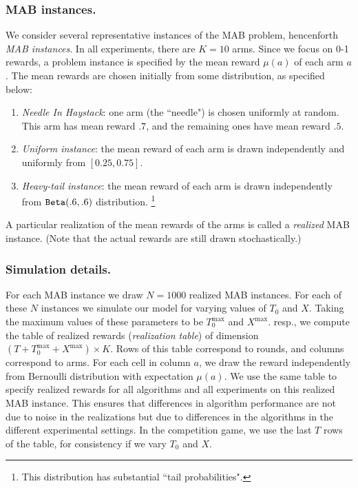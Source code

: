 \documentclass[../competing_bandits.tex]{subfiles}
\begin{document}

\subsubsection{MAB instances.} We consider several representative instances of the MAB problem, hencenforth \emph{MAB instances}. In all experiments, there are $K=10$ arms. Since we focus on 0-1 rewards, a problem instance is specified by the mean reward $\mu(a)$ of each arm $a$. The mean rewards are chosen initially from some distribution, as specified below:
\begin{enumerate}
\item \emph{Needle In Haystack}: one arm (the ``needle") is chosen uniformly at random. This arm has mean reward $.7$, and the remaining ones have mean reward $.5$.

\item \emph{Uniform instance}: the mean reward of each arm is drawn independently and uniformly from $[0.25, 0.75]$.
\item \emph{Heavy-tail instance}: the mean reward of each arm is drawn independently from $\mathtt{Beta}(.6,.6)$ distribution.%
    \footnote{This distribution has substantial ``tail probabilities".}
\end{enumerate}

A particular realization of the mean rewards of the arms is called a \emph{realized} MAB instance. (Note that the actual rewards are still drawn stochastically.)

\subsubsection{Simulation details.} For each MAB instance we draw $N = 1000$ realized MAB instances. For each of these $N$ instances we simulate our model for varying values of $T_0$ and $X$. Taking the maximum values of these parameters to be $T_0^{\max}$ and $X^{\max}$. resp., we compute the table of realized rewards (\emph{realization table}) of dimension $(T+T_0^{\max}+X^{\max}) \times K$. Rows of this table correspond to rounds, and columns correspond to arms. For each cell in column $a$, we draw the reward independently from Bernoulli distribution with expectation $\mu(a)$. We use the same table to specify realized rewards for all algorithms and all experiments on this realized MAB instance. This ensures that differences in algorithm performance are not due to noise in the realizations but due to differences in the algorithms in the different experimental settings. In the competition game, we use the last $T$ rows of the table, for consistency if we vary $T_0$ and $X$.
\end{document}
